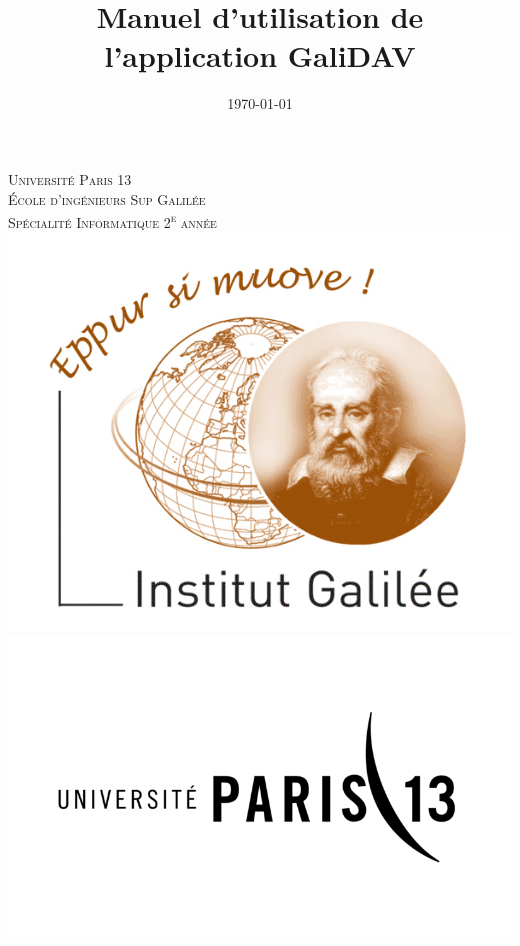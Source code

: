\documentclass[a4paper, 11pt]{report}
\title{Manuel d’utilisation de l’application GaliDAV}
\date{\today}
\begin{document}
	\makeatletter
	\begin{titlepage}
		\centering
		{\large \textsc{Université Paris 13}}\\
		{\large \textsc{École d’ingénieurs Sup Galilée}}\\
		\textsc{Spécialité Informatique 2\textsuperscript{e} année}\\
		\vspace{1cm}
		\includegraphics[scale = 0.3]{logo_galilee.png}
		\hfill
		\includegraphics[scale = 0.3]{logo_paris13.png}\\
		\vspace{1cm}
		\vfill
		{\LARGE \textbf{\@title}} \\
		\vspace{2em}
		{\large \@date} \\
		\vfill
		\hfill
	\end{titlepage}
	\makeatother
	\tableofcontents
\end{document}
